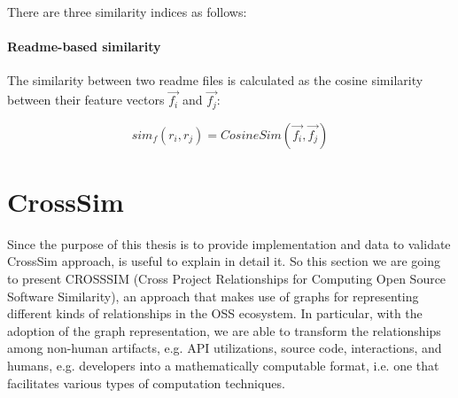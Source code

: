 There are three similarity indices as follows:

\paragraph{Readme-based similarity} 

The similarity between two readme files is calculated as the cosine similarity between their feature vectors $\vec{f_{i}}$ and $\vec{f_{j}}$: 

\begin{equation}
sim_{f}(r_{i},r_{j})=CosineSim(\vec{f_{i}},\vec{f_{j}})
\end{equation}
\clearpage

\section{CrossSim}

Since the purpose of this thesis is to provide implementation and data to validate CrossSim approach, is useful to explain in detail it.
So this section we are going to present CROSSSIM (Cross Project Relationships for Computing Open Source Software Similarity), an approach that makes use of graphs for representing different kinds of relationships in the OSS ecosystem. In particular, with the adoption of the graph representation, we are able to transform the relationships among non-human artifacts, e.g. API utilizations,
source code, interactions, and humans, e.g. developers into a mathematically computable format, i.e. one that facilitates various types of computation techniques.







